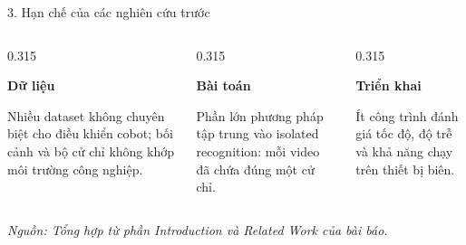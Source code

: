\documentclass[aspectratio=169,9pt]{beamer}
\newcommand{\source}[1]{\vfill{\color{CoboGray}\fontsize{5.4}{6.4}\selectfont\itshape Nguồn: #1.\par}}
\newcommand{\heading}[1]{{\bfseries #1\par}}
\begin{document}
\begin{frame}{3. Hạn chế của các nghiên cứu trước}
  \vspace{0.16cm}
  \begin{columns}[T,onlytextwidth]
    \begin{column}{0.315\textwidth}
      \begin{tcolorbox}[cobobox,height=2.42cm]
        \heading{Dữ liệu}
        Nhiều dataset không chuyên biệt cho điều khiển cobot; bối cảnh và bộ cử chỉ không khớp môi trường công nghiệp.
      \end{tcolorbox}
    \end{column}
    \begin{column}{0.315\textwidth}
      \begin{tcolorbox}[cobobox,height=2.42cm]
        \heading{Bài toán}
        Phần lớn phương pháp tập trung vào isolated recognition: mỗi video đã chứa đúng một cử chỉ.
      \end{tcolorbox}
    \end{column}
    \begin{column}{0.315\textwidth}
      \begin{tcolorbox}[cobobox,height=2.42cm]
        \heading{Triển khai}
        Ít công trình đánh giá tốc độ, độ trễ và khả năng chạy trên thiết bị biên.
      \end{tcolorbox}
    \end{column}
  \end{columns}
  \vspace{0.38cm}
  \centering
  \source{Tổng hợp từ phần Introduction và Related Work của bài báo}
\end{frame}
\end{document}
